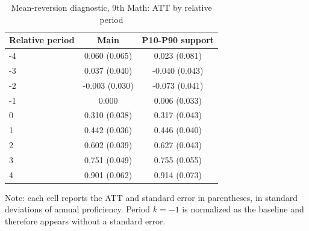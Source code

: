 ﻿\begin{table}[!htbp]
\centering
\caption{Mean-reversion diagnostic, 9th Math: ATT by relative period}
\label{tab:ap_event_regmedia_9th_mat}
\vspace{-0.15cm}
\scriptsize
\setlength{\tabcolsep}{4pt}
\renewcommand{\arraystretch}{0.92}
\begin{tabular}{lcc}
\toprule
Relative period & Main & P10-P90 support \\
\midrule
-4 & 0.060 (0.065) & 0.023 (0.081) \\
-3 & 0.037 (0.040) & -0.040 (0.043) \\
-2 & -0.003 (0.030) & -0.073 (0.041) \\
-1 & 0.000 & 0.006 (0.033) \\
0 & 0.310 (0.038) & 0.317 (0.043) \\
1 & 0.442 (0.036) & 0.446 (0.040) \\
2 & 0.602 (0.039) & 0.627 (0.043) \\
3 & 0.751 (0.049) & 0.755 (0.055) \\
4 & 0.901 (0.062) & 0.914 (0.073) \\
\bottomrule
\end{tabular}
\begin{flushleft}
\footnotesize Note: each cell reports the ATT and standard error in parentheses, in standard deviations of annual proficiency. Period \(k=-1\) is normalized as the baseline and therefore appears without a standard error.
\end{flushleft}
\end{table}



